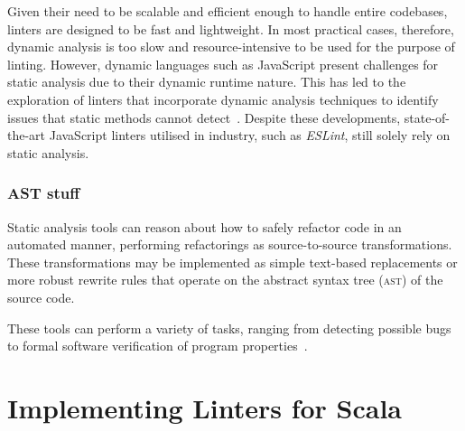 \documentclass[../../main.tex]{subfiles}
\begin{document}
Given their need to be scalable and efficient enough to handle entire codebases, linters are designed to be fast and lightweight.
In most practical cases, therefore, dynamic analysis is too slow and resource-intensive to be used for the purpose of linting.
However, dynamic languages such as JavaScript present challenges for static analysis due to their dynamic runtime nature.
This has led to the exploration of linters that incorporate dynamic analysis techniques to identify issues that static methods cannot detect~\cite{gong_dlint_2015}.
Despite these developments, state-of-the-art JavaScript linters utilised in industry, such as \emph{ESLint}, still solely rely on static analysis.


\subsubsection{AST stuff}


Static analysis tools can reason about how to safely refactor code in an automated manner, performing refactorings as source-to-source transformations.
These transformations may be implemented as simple text-based replacements or more robust rewrite rules that operate on the abstract syntax tree (\textsc{ast}) of the source code.



These tools can perform a variety of tasks, ranging from detecting possible bugs~\cite{johnson_lint_1978,hovemeyer_finding-bugs_2004} to formal software verification of program properties~\cite{blanchet_static-analyzer_2003}.

\section{Implementing Linters for Scala}

\end{document}
